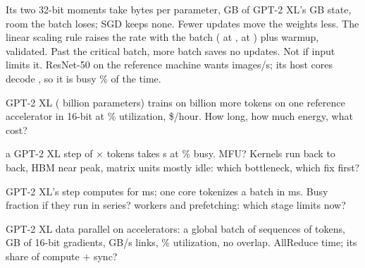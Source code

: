 \documentclass{studysheet}
\begin{document}
\begin{rightcol}
%
  {Its two 32-bit moments take  bytes per parameter,  GB of GPT-2 XL's  GB state,
   room the batch loses; SGD keeps none.}{}
%
  {Fewer updates move the weights less. The linear scaling rule raises the rate with the batch
   ( at ,  at ) plus warmup, validated. Past the critical batch, more batch saves no updates.}{}
%
  {Not if input limits it. ResNet-50 on the reference machine wants  images/s; its host
   cores decode , so it is busy \% of the time.}{}

\vspace{2pt}
\begin{qs}
\item \assumed{} GPT-2 XL ( billion parameters) trains on  billion more tokens on one reference accelerator in 16-bit at
  \% utilization, \$/hour. How long, how much energy, what cost?
\item \assumed{} a GPT-2 XL step of  $\times$  tokens takes  s at
  \% busy. MFU? Kernels run back to back, HBM near peak, matrix units mostly idle:
  which bottleneck, which fix first?
\item GPT-2 XL's step computes for  ms; one core tokenizes a batch in  ms.
  Busy fraction if they run in series? \assumed{}  workers and
  prefetching: which stage limits now?
\item \assumed{} GPT-2 XL data parallel on  accelerators: a global batch of  sequences of 
  tokens,  GB of 16-bit gradients,  GB/s links, \% utilization, no overlap. AllReduce time; its share of compute $+$ sync?
\end{qs}
\end{rightcol}
\end{document}
